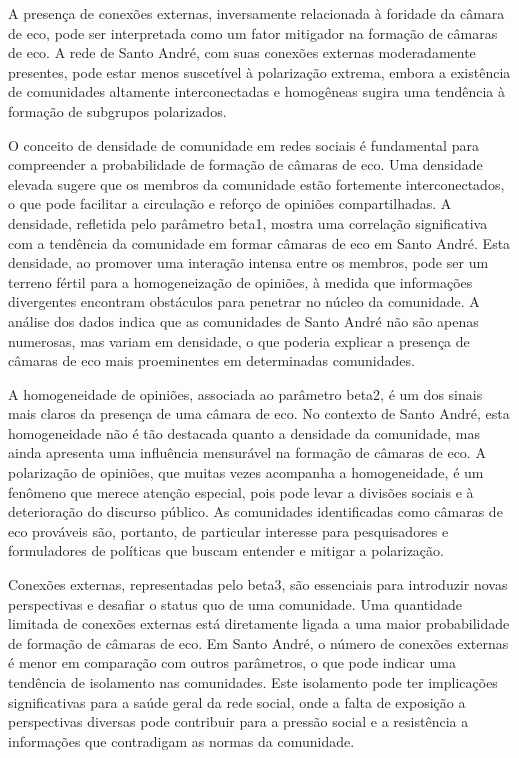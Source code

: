 A presença de conexões externas, inversamente relacionada à foridade da câmara de eco, pode ser interpretada como um fator mitigador na formação de câmaras de eco. A rede de Santo André, com suas conexões externas moderadamente presentes, pode estar menos suscetível à polarização extrema, embora a existência de comunidades altamente interconectadas e homogêneas sugira uma tendência à formação de subgrupos polarizados.

O conceito de densidade de comunidade em redes sociais é fundamental para compreender a probabilidade de formação de câmaras de eco. Uma densidade elevada sugere que os membros da comunidade estão fortemente interconectados, o que pode facilitar a circulação e reforço de opiniões compartilhadas. A densidade, refletida pelo parâmetro beta1, mostra uma correlação significativa com a tendência da comunidade em formar câmaras de eco em Santo André. Esta densidade, ao promover uma interação intensa entre os membros, pode ser um terreno fértil para a homogeneização de opiniões, à medida que informações divergentes encontram obstáculos para penetrar no núcleo da comunidade. A análise dos dados indica que as comunidades de Santo André não são apenas numerosas, mas variam em densidade, o que poderia explicar a presença de câmaras de eco mais proeminentes em determinadas comunidades.

A homogeneidade de opiniões, associada ao parâmetro beta2, é um dos sinais mais claros da presença de uma câmara de eco. No contexto de Santo André, esta homogeneidade não é tão destacada quanto a densidade da comunidade, mas ainda apresenta uma influência mensurável na formação de câmaras de eco. A polarização de opiniões, que muitas vezes acompanha a homogeneidade, é um fenômeno que merece atenção especial, pois pode levar a divisões sociais e à deterioração do discurso público. As comunidades identificadas como câmaras de eco prováveis são, portanto, de particular interesse para pesquisadores e formuladores de políticas que buscam entender e mitigar a polarização.

Conexões externas, representadas pelo beta3, são essenciais para introduzir novas perspectivas e desafiar o status quo de uma comunidade. Uma quantidade limitada de conexões externas está diretamente ligada a uma maior probabilidade de formação de câmaras de eco. Em Santo André, o número de conexões externas é menor em comparação com outros parâmetros, o que pode indicar uma tendência de isolamento nas comunidades. Este isolamento pode ter implicações significativas para a saúde geral da rede social, onde a falta de exposição a perspectivas diversas pode contribuir para a pressão social e a resistência a informações que contradigam as normas da comunidade.

